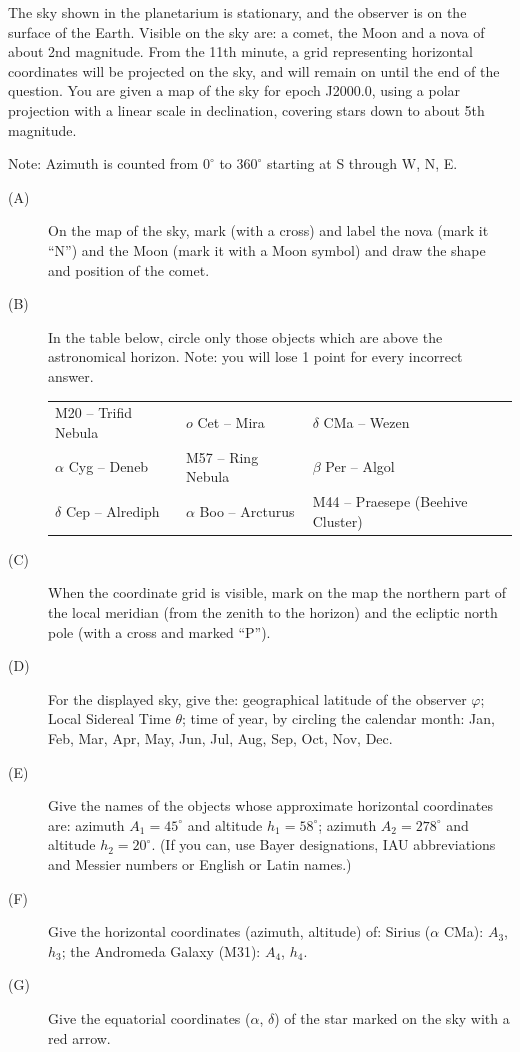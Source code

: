 The sky shown in the planetarium is stationary, and the observer is on the
surface of the Earth. Visible on the sky are: a comet, the Moon and a nova of
about 2nd magnitude. From the 11th minute, a grid representing horizontal
coordinates will be projected on the sky, and will remain on until the end of
the question. You are given a map of the sky for epoch J2000.0, using a polar
projection with a linear scale in declination, covering stars down to about
5th magnitude.

Note: Azimuth is counted from $0^\circ$ to $360^\circ$ starting at S through
W, N, E.

\begin{description}
\item[(A)] On the map of the sky, mark (with a cross) and label the nova
  (mark it ``N'') and the Moon (mark it with a Moon symbol) and draw the
  shape and position of the comet.
\item[(B)] In the table below, circle only those objects which are above the
  astronomical horizon. Note: you will lose 1 point for every incorrect
  answer.

  \begin{center}
  \begin{tabular}{lll}
  M20 -- Trifid Nebula & $o$ Cet -- Mira & $\delta$ CMa -- Wezen \\
  $\alpha$ Cyg -- Deneb & M57 -- Ring Nebula & $\beta$ Per -- Algol \\
  $\delta$ Cep -- Alrediph & $\alpha$ Boo -- Arcturus &
    M44 -- Praesepe (Beehive Cluster) \\
  \end{tabular}
  \end{center}
\item[(C)] When the coordinate grid is visible, mark on the map the northern
  part of the local meridian (from the zenith to the horizon) and the
  ecliptic north pole (with a cross and marked ``P'').
\item[(D)] For the displayed sky, give the:
  geographical latitude of the observer $\varphi$;
  Local Sidereal Time $\theta$;
  time of year, by circling the calendar month:
  Jan, Feb, Mar, Apr, May, Jun, Jul, Aug, Sep, Oct, Nov, Dec.
\item[(E)] Give the names of the objects whose approximate horizontal
  coordinates are:
  azimuth $A_1 = 45^\circ$ and altitude $h_1 = 58^\circ$;
  azimuth $A_2 = 278^\circ$ and altitude $h_2 = 20^\circ$.
  (If you can, use Bayer designations, IAU abbreviations and Messier numbers
  or English or Latin names.)
\item[(F)] Give the horizontal coordinates (azimuth, altitude) of:
  Sirius ($\alpha$ CMa): $A_3$, $h_3$;
  the Andromeda Galaxy (M31): $A_4$, $h_4$.
\item[(G)] Give the equatorial coordinates ($\alpha$, $\delta$) of the star
  marked on the sky with a red arrow.
\end{description}

